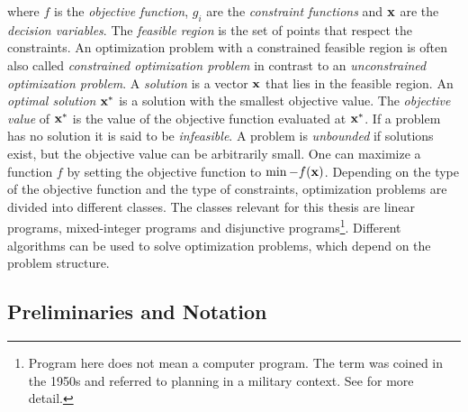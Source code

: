 \quad where $f$ is the \textit{objective function}, $g_i$ are the \textit{constraint functions} and $\bold x$ are the \textit{decision variables}. %
The \textit{feasible region} is the set of points that respect the constraints. An optimization problem with a constrained feasible region is often also called \textit{constrained optimization problem} in contrast to an \textit{unconstrained optimization problem}. A \textit{solution} is a vector $\bold x$ that lies in the feasible region. An \textit{optimal solution} $\bold x^*$ is a solution with the smallest objective value. The \textit{objective value} of $\bold x^*$ is the value of the objective function evaluated at $\bold x^*$. If a problem has no solution it is said to be \textit{infeasible}. A problem is \textit{unbounded} if solutions exist, but the objective value can be arbitrarily small.
One can maximize a function $f$ by setting the objective function to $\min -f(\bold x)$.
Depending on the type of the objective function and the type of constraints, optimization problems are divided into different classes. The classes relevant for this thesis are linear programs, mixed-integer programs and disjunctive programs\footnote[1]{Program here does not mean a computer program. The term was coined in the 1950s and referred to planning in a military context. See \cite{understanding_lp} for more detail.}. 
Different algorithms can be used to solve optimization problems, which depend on the problem structure.

\subsection{Preliminaries and Notation}

